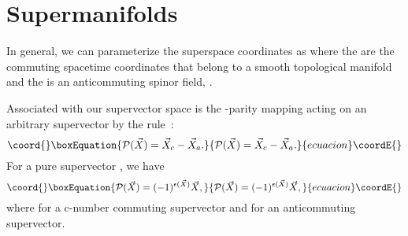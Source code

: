 \documentclass[a4paper,12pt]{article}
\begin{document}
\section{Supermanifolds}

In general, we can parameterize the superspace coordinates as
\coordHE{} where the \coordHE{} are the commuting
spacetime coordinates that belong to a smooth topological manifold and
the \myHighlight{$\beta^\alpha$}\coordHE{} is an anticommuting spinor field,
\coordHE{}.

Associated with our supervector space \coordHE{} is the \coordHE{}-parity mapping \coordHE{} acting
on an arbitrary supervector \coordHE{} by
the rule~\cite{Buchbinder,Berezin}:
\begin{equation}\coord{}\boxEquation{
{\cal P}({\vec X})={\vec X}_c-{\vec X}_a.
}{
{\cal P}({\vec X})={\vec X}_c-{\vec X}_a.
}{ecuacion}\coordE{}\end{equation}
For a pure supervector \coordHE{}, we have
\begin{equation}\coord{}\boxEquation{
{\cal P}({\vec X})=(-1)^{\epsilon({\vec X})}{\vec X},
}{
{\cal P}({\vec X})=(-1)^{\epsilon({\vec X})}{\vec X},
}{ecuacion}\coordE{}\end{equation}
where \coordHE{} for a c-number commuting supervector
and \coordHE{} for an anticommuting supervector.
\end{document}

